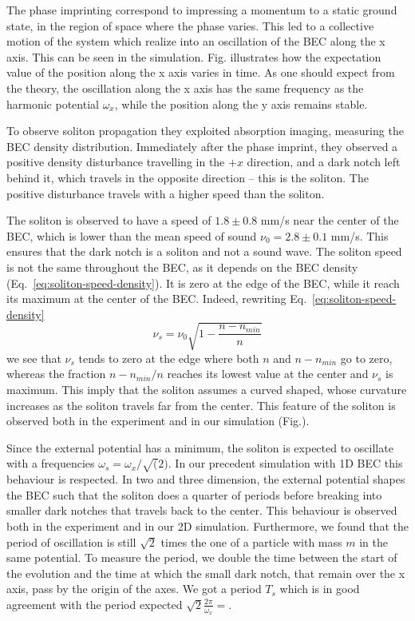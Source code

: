 The phase imprinting correspond to impressing a momentum to a static ground state, in the region of space where the phase varies. This led to a collective motion of the system which realize into an oscillation of the BEC along the x axis. This can be seen in the simulation. Fig.
illustrates how the expectation value of the position along the x axis varies in time. As one should expect from the theory, the oscillation along the x axis has the same frequency as the harmonic potential $\omega_x$, while the position along the y axis remains stable.

To observe soliton propagation they exploited absorption imaging, measuring the BEC density distribution. Immediately after the phase imprint, they observed a positive  density disturbance travelling in the $+x$ direction, and a dark notch left behind it, which travels in the opposite direction -- this is the soliton. The positive disturbance travels with a higher speed than the soliton.

The soliton is observed to have a speed of $1.8 \pm 0.8$ mm/s near the center of the BEC, which is lower than the mean speed of sound $\nu_0 = 2.8 \pm 0.1$ mm/s. This ensures that the dark notch is a soliton and not a sound wave.
 The soliton speed is not the same throughout the BEC, as it depends on the BEC density (Eq.~\eqref{eq:soliton-speed-density}). It is zero at the edge of the BEC, while it reach its maximum at the center of the BEC. Indeed, rewriting Eq.~\eqref{eq:soliton-speed-density}
\begin{equation}
\nu_s = \nu_0 \sqrt{1 - \frac{n - n_{min}}{n}}
\end{equation}
we see that $\nu_s$ tends to zero at the edge where both $n$ and $n - n_{min}$ go to zero, whereas the fraction $n - n_{min} / n$ reaches its lowest value at the center and $\nu_s$ is maximum. This imply that the soliton assumes a curved shaped, whose curvature increases as the soliton travels far from the center. This feature of the soliton is observed both in the experiment and in our simulation (Fig.).

Since the external potential has a minimum, the soliton is expected to oscillate with a frequencies $\omega_s = \omega_x / \sqrt(2)$. In our precedent simulation with 1D BEC this behaviour is respected. In two and three dimension, the external potential shapes the BEC such that the soliton does a quarter of periods before breaking into smaller dark notches that travels back to the center. This behaviour is observed both in  the experiment and in our 2D simulation. Furthermore, we found that the period of oscillation is still $\sqrt{2}$ times the one of a particle with mass $m$ in the same potential. To measure the period, we double the time between the start of the evolution and the time at which the small dark notch, that remain over the x axis, pass by the origin of the axes. We got a period $T_s$ which is in good agreement with the period expected $\sqrt{2} \frac{2\pi}{\omega_x} = $.

